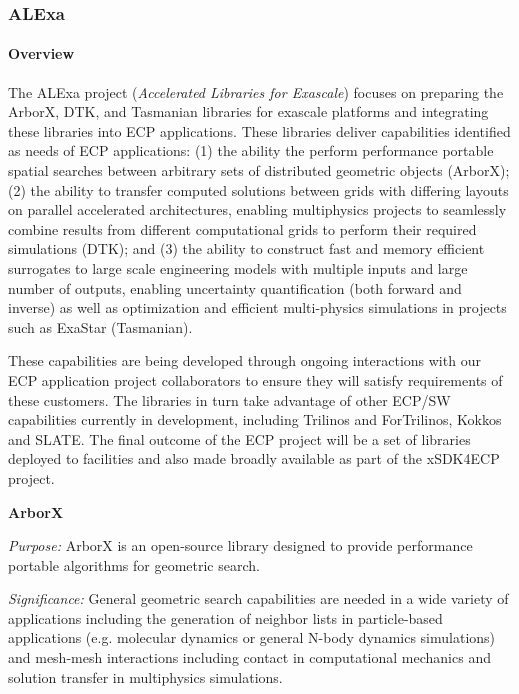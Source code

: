 \subsubsection{ ALExa}


\paragraph{Overview}

The ALExa project ({\sl Accelerated Libraries for Exascale}) focuses on
preparing the ArborX, DTK, and Tasmanian libraries for exascale platforms and
integrating these libraries into ECP applications.  These libraries deliver
capabilities identified as needs of ECP applications: (1) the ability the
perform performance portable spatial searches between arbitrary sets of
distributed geometric objects (ArborX); (2) the ability to transfer computed
solutions between grids with differing layouts on parallel accelerated
architectures, enabling multiphysics projects to seamlessly combine results
from different computational grids to perform their required simulations
(DTK); and (3) the ability to construct fast and memory efficient surrogates
to large scale engineering models with multiple inputs and large number of
outputs, enabling uncertainty quantification (both forward and inverse) as
well as optimization and efficient multi-physics simulations in projects such
as ExaStar (Tasmanian).

These capabilities are being developed through ongoing interactions with our
ECP application project collaborators to ensure they will satisfy requirements
of these customers.  The libraries in turn take advantage of other ECP/SW
capabilities currently in development, including Trilinos and ForTrilinos,
Kokkos and SLATE.  The final outcome of the ECP project will be a set of
libraries deployed to facilities and also made broadly available as part of
the xSDK4ECP project.


{\bf ArborX}

{\it Purpose:} ArborX is an open-source library designed to provide
performance portable algorithms for geometric search.

{\it Significance:} General geometric search capabilities are needed in a wide
variety of applications including the generation of neighbor lists in
particle-based applications (e.g. molecular dynamics or general N-body
dynamics simulations) and mesh-mesh interactions including contact in
computational mechanics and solution transfer in multiphysics simulations.

